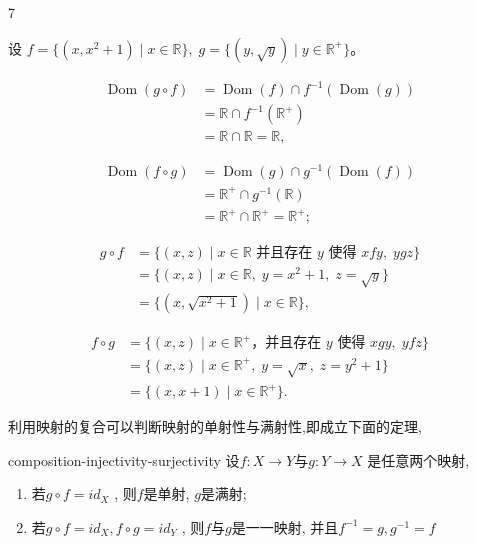\begin{sourceexample}{7}

设 \(f = \{(x, x^2 + 1) \mid x \in \mathbb{R}\},\; g = \{(y, \sqrt{y}) \mid y \in \mathbb{R}^+\}\)。

\begin{align*}
	\operatorname{Dom}(g \circ f) &= \operatorname{Dom}(f) \cap f^{-1}(\operatorname{Dom}(g)) \\
	&= \mathbb{R} \cap f^{-1}(\mathbb{R}^+) \\
	&= \mathbb{R} \cap \mathbb{R} = \mathbb{R},
\end{align*}

\begin{align*}
	\operatorname{Dom}(f \circ g) &= \operatorname{Dom}(g) \cap g^{-1}(\operatorname{Dom}(f)) \\
	&= \mathbb{R}^+ \cap g^{-1}(\mathbb{R}) \\
	&= \mathbb{R}^+ \cap \mathbb{R}^+ = \mathbb{R}^+;
\end{align*}

\begin{align*}
	g \circ f &= \{(x, z) \mid x \in \mathbb{R} \text{ 并且存在 } y \text{ 使得 } x f y,\; y g z\} \\
	&= \{(x, z) \mid x \in \mathbb{R},\; y = x^2 + 1,\; z = \sqrt{y}\} \\
	&= \{(x, \sqrt{x^2+1}) \mid x \in \mathbb{R}\},
\end{align*}

\begin{align*}
	f \circ g &= \{(x, z) \mid x \in \mathbb{R}^+ \text{，并且存在 } y \text{ 使得 } x g y,\; y f z\} \\
	&= \{(x, z) \mid x \in \mathbb{R}^+,\; y = \sqrt{x},\; z = y^2 + 1\} \\
	&= \{(x, x+1) \mid x \in \mathbb{R}^+\}.
\end{align*}

\end{sourceexample}



利用映射的复合可以判断映射的单射性与满射性,即成立下面的定理,

\begin{mythm}{}{composition-injectivity-surjectivity}
设\(f: X \rightarrow Y \text{与} g:Y \rightarrow X\) 是任意两个映射,
	\begin{enumerate}[label=\arabic*)]
		\item 若\(g \circ f = id_X\) , 则$f$是单射, $g$是满射;
		\item 若\(g \circ f = id_X, f \circ g = id_Y\) , 则$f$与$g$是一一映射, 并且$f^{-1}=g,g^{-1}=f$ 
 	\end{enumerate}
\end{mythm}

